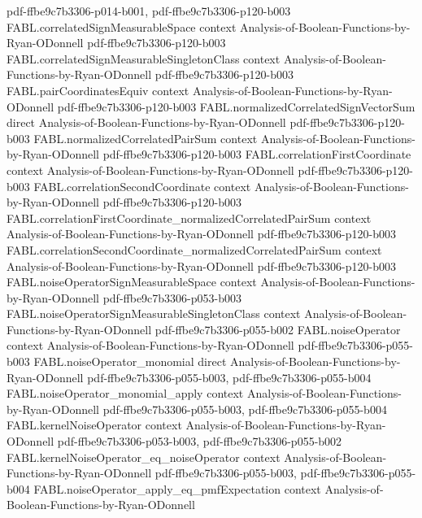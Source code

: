 \begin{theorem}
  {pdf-ffbe9c7b3306-p014-b001,
    pdf-ffbe9c7b3306-p120-b003}
\proofstep
  {FABL.correlatedSignMeasurableSpace}
  {context}
  {Analysis-of-Boolean-Functions-by-Ryan-ODonnell}
  {pdf-ffbe9c7b3306-p120-b003}
\proofstep
  {FABL.correlatedSignMeasurableSingletonClass}
  {context}
  {Analysis-of-Boolean-Functions-by-Ryan-ODonnell}
  {pdf-ffbe9c7b3306-p120-b003}
\proofstep
  {FABL.pairCoordinatesEquiv}
  {context}
  {Analysis-of-Boolean-Functions-by-Ryan-ODonnell}
  {pdf-ffbe9c7b3306-p120-b003}
\proofstep
  {FABL.normalizedCorrelatedSignVectorSum}
  {direct}
  {Analysis-of-Boolean-Functions-by-Ryan-ODonnell}
  {pdf-ffbe9c7b3306-p120-b003}
\proofstep
  {FABL.normalizedCorrelatedPairSum}
  {context}
  {Analysis-of-Boolean-Functions-by-Ryan-ODonnell}
  {pdf-ffbe9c7b3306-p120-b003}
\proofstep
  {FABL.correlationFirstCoordinate}
  {context}
  {Analysis-of-Boolean-Functions-by-Ryan-ODonnell}
  {pdf-ffbe9c7b3306-p120-b003}
\proofstep
  {FABL.correlationSecondCoordinate}
  {context}
  {Analysis-of-Boolean-Functions-by-Ryan-ODonnell}
  {pdf-ffbe9c7b3306-p120-b003}
\proofstep
  {FABL.correlationFirstCoordinate_normalizedCorrelatedPairSum}
  {context}
  {Analysis-of-Boolean-Functions-by-Ryan-ODonnell}
  {pdf-ffbe9c7b3306-p120-b003}
\proofstep
  {FABL.correlationSecondCoordinate_normalizedCorrelatedPairSum}
  {context}
  {Analysis-of-Boolean-Functions-by-Ryan-ODonnell}
  {pdf-ffbe9c7b3306-p120-b003}
\proofstep
  {FABL.noiseOperatorSignMeasurableSpace}
  {context}
  {Analysis-of-Boolean-Functions-by-Ryan-ODonnell}
  {pdf-ffbe9c7b3306-p053-b003}
\proofstep
  {FABL.noiseOperatorSignMeasurableSingletonClass}
  {context}
  {Analysis-of-Boolean-Functions-by-Ryan-ODonnell}
  {pdf-ffbe9c7b3306-p055-b002}
\proofstep
  {FABL.noiseOperator}
  {context}
  {Analysis-of-Boolean-Functions-by-Ryan-ODonnell}
  {pdf-ffbe9c7b3306-p055-b003}
\proofstep
  {FABL.noiseOperator_monomial}
  {direct}
  {Analysis-of-Boolean-Functions-by-Ryan-ODonnell}
  {pdf-ffbe9c7b3306-p055-b003,
    pdf-ffbe9c7b3306-p055-b004}
\proofstep
  {FABL.noiseOperator_monomial_apply}
  {context}
  {Analysis-of-Boolean-Functions-by-Ryan-ODonnell}
  {pdf-ffbe9c7b3306-p055-b003,
    pdf-ffbe9c7b3306-p055-b004}
\proofstep
  {FABL.kernelNoiseOperator}
  {context}
  {Analysis-of-Boolean-Functions-by-Ryan-ODonnell}
  {pdf-ffbe9c7b3306-p053-b003,
    pdf-ffbe9c7b3306-p055-b002}
\proofstep
  {FABL.kernelNoiseOperator_eq_noiseOperator}
  {context}
  {Analysis-of-Boolean-Functions-by-Ryan-ODonnell}
  {pdf-ffbe9c7b3306-p055-b003,
    pdf-ffbe9c7b3306-p055-b004}
\proofstep
  {FABL.noiseOperator_apply_eq_pmfExpectation}
  {context}
  {Analysis-of-Boolean-Functions-by-Ryan-ODonnell}

\end{theorem}
